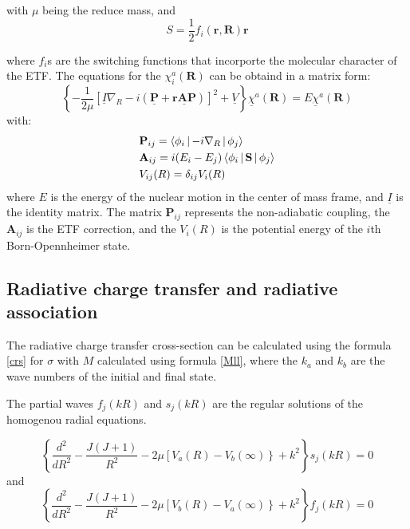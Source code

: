 with $ \mu $ being the reduce mass, and 
\begin{equation}
S = \frac{1}{2}f_i(\mathbf{r},\mathbf{R})\mathbf{r}
\end{equation}

where $ f_i $s are the switching functions that incorporte the molecular character of the ETF.
The equations for the $ \chi_i^a(\mathbf{R}) $ can be obtaind in a matrix form:
\begin{equation}
\left\{-\frac{1}{2\mu}\left[\underline{I}\nabla_R - i(\underline{\mathbf{P}} + \underline{\mathbf{rAP}})\right]^2 + \underline{V}\right\}\underline{\chi}^a(\mathbf{R}) = E\underline{\chi}^a(\mathbf{R})
\end{equation}
with:
\begin{equation}\label{matrixFactors}
\begin{split}
& \mathbf{P}_{ij} = \Braket{\phi_i | -i\nabla_R | \phi_j} \\*
& \mathbf{A}_{ij} = i(E_i - E_j)\Braket{\phi_i | \mathbf{S} | \phi_j} \\*
& V_{ij}(R) = \delta_{ij}V_i(R)
\end{split}
\end{equation}
where $ E $ is the energy of the nuclear motion in the center of mass frame, and $ \underline{I} $ is the identity matrix. The matrix $ \mathbf{P}_{ij} $ represents the non-adiabatic coupling, the $ \mathbf{A}_{ij} $ is the ETF correction, and the $ V_i(R) $ is the potential energy of the $ i $th Born-Opennheimer state.

\subsection{ Radiative charge transfer and radiative association}

The radiative charge transfer cross-section can be calculated using the formula \eqref{crs} for $ \sigma $ with $ M $ calculated using formula \eqref{Mll}, where the $ k_a $ and $ k_b $ are the wave numbers of the initial and final state. 

The partial waves $ f_j(kR) $ and $ s_j(kR) $ are the regular solutions of the homogenou radial equations.

\begin{equation}
\left\{\frac{d^2}{dR^2} - \frac{J(J+1)}{R^2} - 2\mu\left[V_a(R) - V_b(\infty)\right\} + k^2\right\}s_j(kR) = 0
\end{equation}
and
\begin{equation}
\left\{\frac{d^2}{dR^2} - \frac{J(J+1)}{R^2} - 2\mu\left[V_b(R) - V_a(\infty)\right\} + k^2\right\}f_j(kR) = 0
\end{equation}

